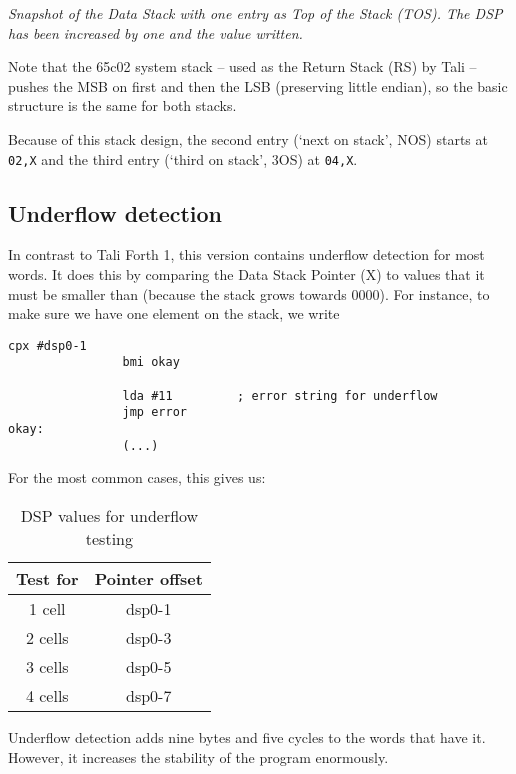 \textit{Snapshot of the Data Stack with one entry as Top of the Stack (TOS). The
DSP has been increased by one and the value written.}

Note that the 65c02 system stack -- used as the Return Stack (RS) by Tali --
pushes the MSB on first and then the LSB (preserving little endian), so the
basic structure is the same for both stacks. 

Because of this stack design, the second entry (`next on stack', NOS) starts at
\texttt{02,X} and the third entry (`third on stack', 3OS) at \texttt{04,X}. 

\subsection{Underflow detection} In contrast to Tali
Forth 1, this version contains underflow detection for most
words. It does this by comparing the Data Stack Pointer (X) to
values that it must be smaller than (because the stack grows towards 0000). For
instance, to make sure we have one element on the stack, we write

\begin{lstlisting}[frame=lines]
                cpx #dsp0-1
                bmi okay

                lda #11         ; error string for underflow
                jmp error
okay:
                (...)
\end{lstlisting}

\noindent For the most common cases, this gives us:

\begin{table}[h!]
\centering
\begin{tabular}{ | c | c | }
        \hline
        Test for &  Pointer offset\\
        \hline
        1 cell   &  dsp0-1\\
        2 cells  &  dsp0-3\\
        3 cells  &  dsp0-5\\
        4 cells  &  dsp0-7\\
        \hline
\end{tabular}
        \caption{DSP values for underflow testing}
        \label{table_uf}
\end{table}

Underflow detection adds nine bytes and five cycles
to the words that have it. However, it increases the stability of the
program enormously.

